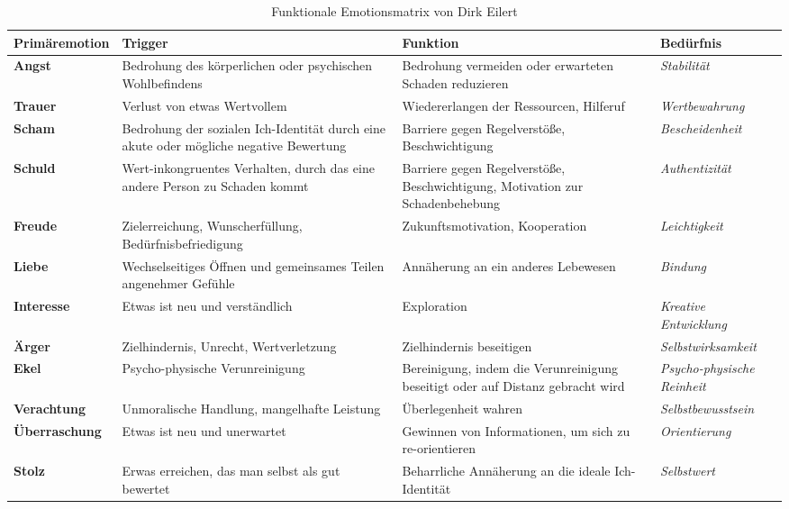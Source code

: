 \begin{table}[H]
\renewcommand{\arraystretch}{1.5}
\centering
\begin{tabular}{L{3cm}|L{4.5cm}|L{4.6cm}|L{3.5cm}}
\textbf{Primäremotion} & \textbf{Trigger} & \textbf{Funktion} & \textbf{Bedürfnis}\\
\hline

\textbf{Angst} & Bedrohung des körperlichen oder psychischen Wohlbefindens & Bedrohung vermeiden oder erwarteten Schaden reduzieren & \textit{Stabilität} \\
\textbf{Trauer} & Verlust von etwas Wertvollem & Wiedererlangen der Ressourcen, Hilferuf & \textit{Wertbewahrung} \\
\textbf{Scham} & Bedrohung der sozialen Ich-Identität durch eine akute oder mögliche negative Bewertung & Barriere gegen Regelverstöße, Beschwichtigung & \textit{Bescheidenheit} \\
\textbf{Schuld} & Wert-inkongruentes Verhalten, durch das eine andere Person zu Schaden kommt & Barriere gegen Regelverstöße, Beschwichtigung, Motivation zur Schadenbehebung & \textit{Authentizität} \\
\textbf{Freude} & Zielerreichung, Wunscherfüllung, Bedürfnisbefriedigung & Zukunftsmotivation, Kooperation & \textit{Leichtigkeit} \\
\textbf{Liebe} & Wechselseitiges Öffnen und gemeinsames Teilen angenehmer Gefühle & Annäherung an ein anderes Lebewesen & \textit{Bindung} \\
\textbf{Interesse} & Etwas ist neu und verständlich & Exploration & \textit{Kreative Entwicklung} \\
\textbf{Ärger} & Zielhindernis, Unrecht, Wertverletzung & Zielhindernis beseitigen & \textit{Selbstwirksamkeit} \\
\textbf{Ekel} & Psycho-physische Verunreinigung & Bereinigung, indem die Verunreinigung beseitigt oder auf Distanz gebracht wird & \textit{Psycho-physische Reinheit} \\
\textbf{Verachtung} & Unmoralische Handlung, mangelhafte Leistung & Überlegenheit wahren & \textit{Selbstbewusstsein} \\
\textbf{Überraschung} & Etwas ist neu und unerwartet & Gewinnen von Informationen, um sich zu re-orientieren & \textit{Orientierung} \\
\textbf{Stolz} & Erwas erreichen, das man selbst als gut bewertet & Beharrliche Annäherung an die ideale Ich-Identität & \textit{Selbstwert} \\
\end{tabular}
\caption{Funktionale Emotionsmatrix von Dirk Eilert}
\label{tab:emotionsmatrix}
\end{table}

